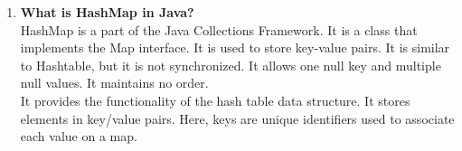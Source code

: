 \documentclass[11pt]{article}
\begin{document}
\begin{enumerate}
	\item \textbf{What is HashMap in Java?}\\
	HashMap is a part of the Java Collections Framework. It is a class that implements the Map interface. It is used to store key-value pairs. It is similar to Hashtable, but it is not synchronized. It allows one null key and multiple null values. It maintains no order.\\

	It provides the functionality of the hash table data structure. It stores elements in key/value pairs. Here, keys are unique identifiers used to associate each value on a map.
\end{enumerate}
\end{document}
